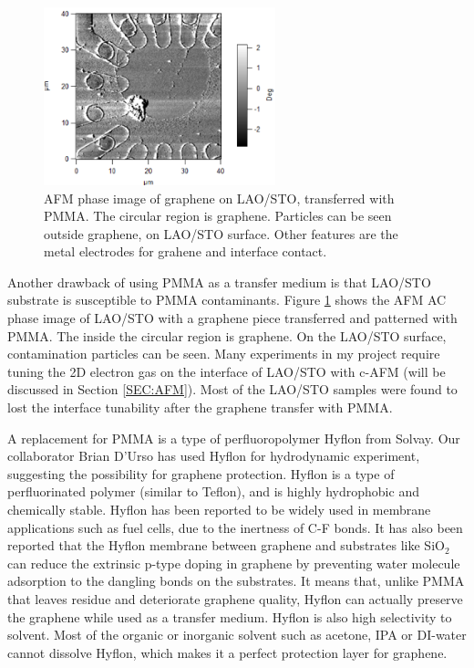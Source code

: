 \documentclass[pdflatex, sectionletters, 12pt]{pittetd}    %
\begin{document}
\begin{figure}[h!]
	\centering
	\includegraphics[width=0.60\textwidth]{Drawing/PMMAResidue.png}
	\caption{AFM phase image of graphene on LAO/STO, transferred with PMMA. The circular region is graphene. Particles can be seen outside graphene, on LAO/STO surface. Other features are the metal electrodes for grahene and interface contact.}
	\label{FIG:PMMAResidue}
\end{figure}

Another drawback of using PMMA as a transfer medium is that LAO/STO substrate is susceptible to PMMA contaminants. Figure \ref{FIG:PMMAResidue} shows the AFM AC phase image of  LAO/STO with a graphene piece transferred and patterned with PMMA. The inside the circular region is graphene. On the LAO/STO surface, contamination particles can be seen. Many experiments in my project require tuning the 2D electron gas on the interface of LAO/STO with c-AFM (will be discussed in Section \ref{SEC:AFM}). Most of the LAO/STO samples were found to lost the interface tunability after the graphene transfer with PMMA\cite{li2016method}. 

A replacement for PMMA is a type of perfluoropolymer Hyflon from Solvay. Our collaborator Brian D'Urso has used Hyflon for hydrodynamic experiment, suggesting the possibility for graphene protection. Hyflon is a type of perfluorinated polymer (similar to Teflon), and is highly hydrophobic and chemically stable. Hyflon has been reported to be widely used in membrane applications such as fuel cells, due to the inertness of C-F bonds\cite{arcella2005hyflon, merlo2007membrane, zhang2012recent}. It has also been reported that the Hyflon membrane between graphene and substrates like SiO$_2$ can reduce the extrinsic p-type doping in graphene by preventing water molecule adsorption to the dangling bonds on the substrates\cite{mattevi2012solution}. It means that, unlike PMMA that leaves residue and deteriorate graphene quality, Hyflon can actually preserve the graphene while used as a transfer medium. Hyflon is also high selectivity to solvent. Most of the organic or inorganic solvent such as acetone, IPA or DI-water cannot dissolve Hyflon, which makes it a perfect protection layer for graphene. 
\end{document}
